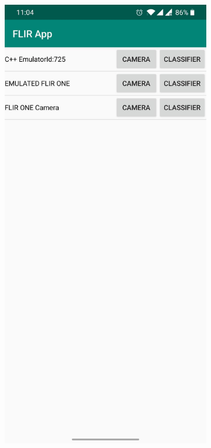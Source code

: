 \documentclass{l4proj}
\begin{document}
\begin{appendices}
\begin{figure}[ht]
  \centering
  \begin{subfigure}[h!]{0.32\textwidth}
    \includegraphics[width=\textwidth]{images/app/overview.jpg}

\end{subfigure}
\end{figure}
\end{appendices}
\end{document}
